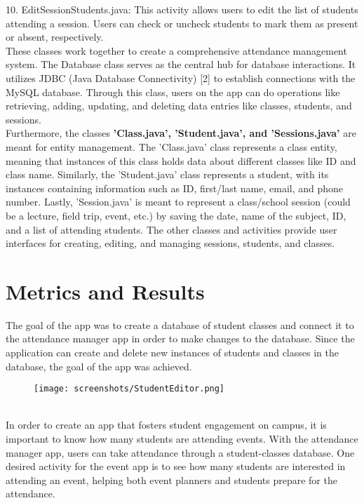 \documentclass[10pt,twocolumn]{article}
\begin{document}
10. EditSessionStudents.java: This activity allows users to edit the list of students attending a session. Users can check or uncheck students to mark them as present or absent, respectively.\\
These classes work together to create a comprehensive attendance management system. The Database class serves as the central hub for database interactions. It utilizes JDBC (Java Database Connectivity) [2] to establish connections with the MySQL database. Through this class, users on the app can do operations like retrieving, adding, updating, and deleting data entries like classes, students, and sessions.
\\Furthermore, the classes \textbf{'Class.java', 'Student.java', and 'Sessions.java'}
are meant for entity management. The 'Class.java' class represents a class entity, meaning that instances of this class holds data about different classes like ID and class name. Similarly, the 'Student.java' class represents a student, with its instances containing information such as ID, first/last name, email, and phone number. Lastly, 'Session.java' is meant to represent a class/school session (could be a lecture, field trip, event, etc.) by saving the date, name of the subject, ID, and a list of attending students. The other classes and activities provide user interfaces for creating, editing, and managing sessions, students, and classes.

\section{Metrics and Results}
The goal of the app was to create a database of student classes and connect it to the attendance manager app in order to make changes to the database. Since the application can create and delete new instances of students and classes in the database, the goal of the app was achieved. \begin{figure}[ht]
\texttt{[image: screenshots/StudentEditor.png]}
\centering
\end{figure} \\
In order to create an app that fosters student engagement on campus, it is important to know how many students are attending events. With the attendance manager app, users can take attendance through a student-classes database. One desired activity for the event app is to see how many students are interested in attending an event, helping both event planners and students prepare for the attendance.
\end{document}
